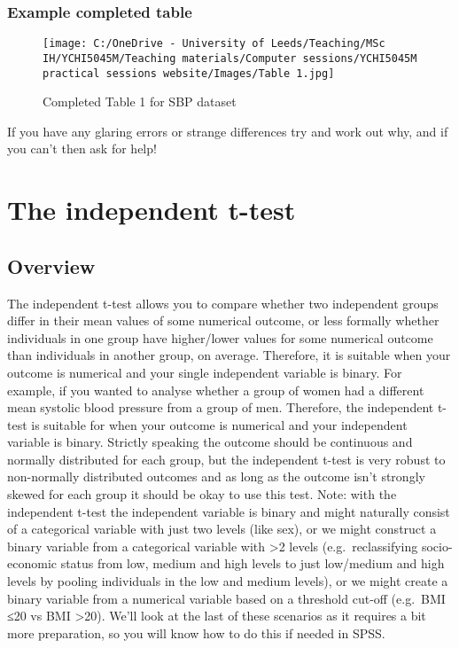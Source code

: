 \documentclass[
]{book}
\begin{document}
\hypertarget{example-completed-table}{%
\subsection{Example completed table}\label{example-completed-table}}

\begin{figure}
\centering
\texttt{[image: C:/OneDrive - University of Leeds/Teaching/MSc IH/YCHI5045M/Teaching materials/Computer sessions/YCHI5045M practical sessions website/Images/Table 1.jpg]}
\caption{Completed Table 1 for SBP dataset}
\end{figure}

If you have any glaring errors or strange differences try and work out why, and if you can't then ask for help!

\hypertarget{the-independent-t-test}{%
\chapter{The independent t-test}\label{the-independent-t-test}}

\hypertarget{overview-10}{%
\section{Overview}\label{overview-10}}

The independent t-test allows you to compare whether two independent groups differ in their mean values of some numerical outcome, or less formally whether individuals in one group have higher/lower values for some numerical outcome than individuals in another group, on average. Therefore, it is suitable when your outcome is numerical and your single independent variable is binary. For example, if you wanted to analyse whether a group of women had a different mean systolic blood pressure from a group of men. Therefore, the independent t-test is suitable for when your outcome is numerical and your independent variable is binary. Strictly speaking the outcome should be continuous and normally distributed for each group, but the independent t-test is very robust to non-normally distributed outcomes and as long as the outcome isn't strongly skewed for each group it should be okay to use this test. Note: with the independent t-test the independent variable is binary and might naturally consist of a categorical variable with just two levels (like sex), or we might construct a binary variable from a categorical variable with \textgreater2 levels (e.g.~reclassifying socio-economic status from low, medium and high levels to just low/medium and high levels by pooling individuals in the low and medium levels), or we might create a binary variable from a numerical variable based on a threshold cut-off (e.g.~BMI ≤20 vs BMI \textgreater20). We'll look at the last of these scenarios as it requires a bit more preparation, so you will know how to do this if needed in SPSS.
\end{document}

